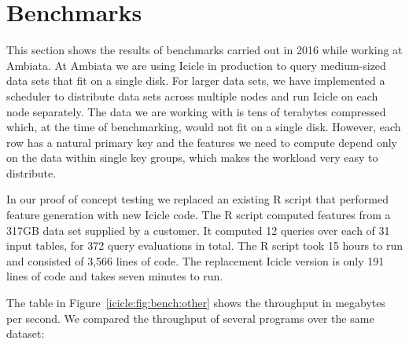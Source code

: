 \section{Benchmarks}
\label{icicle:s:Benchmarks}


This section shows the results of benchmarks carried out in 2016 while working at Ambiata.
At Ambiata we are using Icicle in production to query medium-sized data sets that fit on a single disk.
For larger data sets, we have implemented a scheduler to distribute data sets across multiple nodes and run Icicle on each node separately.
The data we are working with is tens of terabytes compressed which, at the time of benchmarking, would not fit on a single disk.
However, each row has a natural primary key and the features we need to compute depend only on the data within single key groups, which makes the workload very easy to distribute.


In our proof of concept testing we replaced an existing R script that performed feature generation with new Icicle code.
The R script computed features from a 317GB data set supplied by a customer.
It computed 12 queries over each of 31 input tables, for 372 query evaluations in total.
The R script took 15 hours to run and consisted of 3,566 lines of code.
The replacement Icicle version is only 191 lines of code and takes seven minutes to run.

The table in Figure~\ref{icicle:fig:bench:other} shows the throughput in megabytes per second.
We compared the throughput of several programs over the same dataset:

